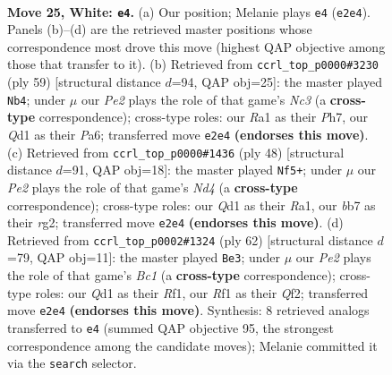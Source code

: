 \documentclass[11pt]{article}
\begin{document}
\clearpage

\begin{figure}[p]\centering
\begin{subfigure}{0.46\textwidth}\centering
\resizebox{\linewidth}{!}{%
\newchessgame
\chessboard[
  setfen={1n2k3/1b6/8/ppb2p2/8/8/PN2Pr2/R2Q1R1K w - - 0 25},
  showmover=false,
  pgfstyle=straightmove, color=movearrow, markmove={e2-e4}
]}
\caption{}
\end{subfigure}\hfill
\begin{subfigure}{0.46\textwidth}\centering
\resizebox{\linewidth}{!}{%
\newchessgame
\chessboard[
  setfen={2k5/2r2p1p/p1nRp3/8/P7/8/PB2KPrP/2R5 b - - 9 30},
  showmover=false,
  pgfstyle=straightmove, color=movearrow, markmove={c6-b4}
]}
\caption{}
\end{subfigure}
\\[4pt]
\begin{subfigure}{0.46\textwidth}\centering
\resizebox{\linewidth}{!}{%
\newchessgame
\chessboard[
  setfen={3r4/pp2k3/2p5/8/3N3b/5p2/PPP3r1/R2R1K2 w - - 0 25},
  showmover=false,
  pgfstyle=straightmove, color=movearrow, markmove={d4-f5}
]}
\caption{}
\end{subfigure}\hfill
\begin{subfigure}{0.46\textwidth}\centering
\resizebox{\linewidth}{!}{%
\newchessgame
\chessboard[
  setfen={r7/1p2N2k/7n/p2p4/3b4/1P4Pq/5Q2/2B2RK1 w - - 1 32},
  showmover=false,
  pgfstyle=straightmove, color=movearrow, markmove={c1-e3}
]}
\caption{}
\end{subfigure}
\caption{\textbf{Move 25, White: \texttt{e4}.} (a) Our position; Melanie plays \texttt{e4} (\texttt{e2e4}). Panels (b)--(d) are the retrieved master positions whose correspondence most drove this move (highest QAP objective among those that transfer to it). (b) Retrieved from \texttt{ccrl\_top\_p0000\#3230} (ply 59) [structural distance $d$=94, QAP obj=25]: the master played \texttt{Nb4}; under $\mu$ our \emph{Pe2} plays the role of that game's \emph{Nc3} (a \textbf{cross-type} correspondence); cross-type roles: our \emph{R}a1 as their \emph{P}h7, our \emph{Q}d1 as their \emph{P}a6; transferred move \texttt{e2e4} \textbf{(endorses this move)}. (c) Retrieved from \texttt{ccrl\_top\_p0000\#1436} (ply 48) [structural distance $d$=91, QAP obj=18]: the master played \texttt{Nf5+}; under $\mu$ our \emph{Pe2} plays the role of that game's \emph{Nd4} (a \textbf{cross-type} correspondence); cross-type roles: our \emph{Q}d1 as their \emph{R}a1, our \emph{b}b7 as their \emph{r}g2; transferred move \texttt{e2e4} \textbf{(endorses this move)}. (d) Retrieved from \texttt{ccrl\_top\_p0002\#1324} (ply 62) [structural distance $d$=79, QAP obj=11]: the master played \texttt{Be3}; under $\mu$ our \emph{Pe2} plays the role of that game's \emph{Bc1} (a \textbf{cross-type} correspondence); cross-type roles: our \emph{Q}d1 as their \emph{R}f1, our \emph{R}f1 as their \emph{Q}f2; transferred move \texttt{e2e4} \textbf{(endorses this move)}. Synthesis: 8 retrieved analogs transferred to \texttt{e4} (summed QAP objective 95, the strongest correspondence among the candidate moves); Melanie committed it via the \texttt{search} selector.}
\label{fig:thought-m48}
\end{figure}
\end{document}
